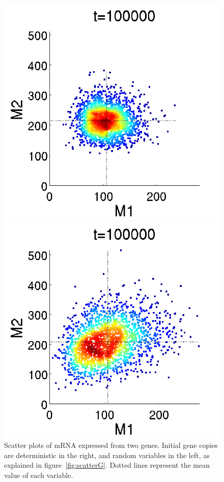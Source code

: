 \documentclass[letterpaper]{article}
\begin{document}
\begin{figure}[H]
  \begin{minipage}[b]{0.48\linewidth}
    \centering
    \includegraphics[scale=0.40]{figures/rna2_doc2_ssM1_vs_M2.png}
  \end{minipage}
  \begin{minipage}[b]{0.48\linewidth}
    \centering
    \includegraphics[scale=0.40]{figures/rna2_doc3_ssM1_vs_M2.png}
  \end{minipage}
  \caption{Scatter plots of mRNA expressed from two genes. Initial gene
    copies are deterministic in the right, and random variables in the
    left, as explained in figure~\ref{fig:scatterG}. Dotted lines
    represent the mean value of each variable.}
  \label{fig:scatterM}
\end{figure}
\end{document}
